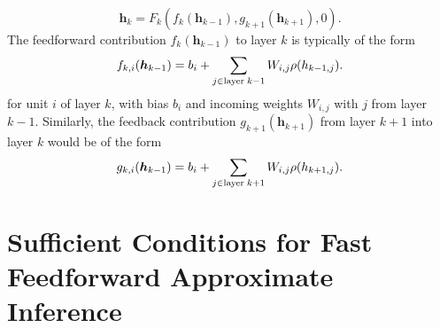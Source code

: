 \documentclass{article}
\newcommand   \vh{{\bm h}}
\begin{document}
\begin{equation}
 \vh_k = F_k(f_k(\vh_{k-1}),g_{k+1}(\vh_{k+1}),0).
\end{equation}
The feedforward contribution $f_k(\vh_{k-1})$ to layer $k$ is typically of the form
\begin{equation}
   f_{k,i}(\vh_{k-1}) = b_i + \sum_{j \in {\rm layer}\; k-1} W_{i,j} \rho(h_{k-1,j}).
\end{equation}
for unit $i$ of layer $k$, with bias $b_i$ and incoming weights $W_{i,j}$ with $j$ from layer $k-1$.
Similarly, the feedback contribution $g_{k+1}(\vh_{k+1})$ from layer $k+1$ into layer $k$ would
be of the form
\begin{equation}
   g_{k,i}(\vh_{k-1}) = b_i + \sum_{j \in {\rm layer}\; k+1} W_{i,j} \rho(h_{k+1,j}).
\end{equation}



\section{Sufficient Conditions for Fast Feedforward Approximate Inference}
\end{document}
